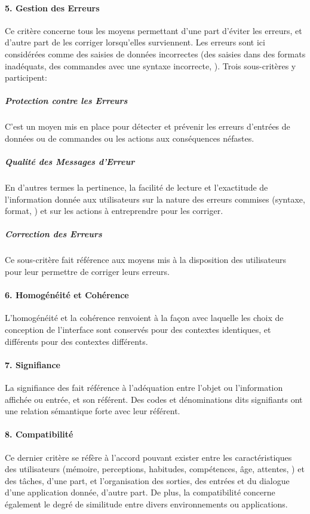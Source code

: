         \paragraph{5. Gestion des Erreurs}
            Ce critère concerne tous les moyens permettant d’une part d’éviter  les erreurs, et d’autre part de les corriger lorsqu’elles surviennent. Les erreurs sont ici considérées comme des saisies de données incorrectes (\eg des saisies dans des formats inadéquats, des commandes avec une syntaxe incorrecte, \etc). Trois sous-critères y participent:
            \subparagraph{Protection contre les Erreurs}
                C'est un moyen mis en place pour détecter et prévenir les erreurs d’entrées de données ou de commandes ou les actions aux conséquences néfastes.
            \subparagraph{Qualité des Messages d’Erreur}
                En d'autres termes la pertinence, la facilité de lecture et l’exactitude de l’information donnée aux utilisateurs sur la nature des erreurs commises (syntaxe, format, \etc) et sur les actions à entreprendre pour les corriger.
            \subparagraph{Correction des Erreurs}
                Ce sous-critère fait référence aux moyens mis à la disposition des utilisateurs pour leur permettre de corriger leurs erreurs.
        \paragraph{6. Homogénéité et Cohérence}
            L'homogénéité et la cohérence renvoient à la façon avec laquelle les choix de conception de l’interface sont conservés pour des contextes identiques, et différents pour des contextes différents.
        \paragraph{7. Signifiance}
            La signifiance des  fait référence à l’adéquation entre l’objet ou l’information affichée ou entrée, et son référent. Des codes et dénominations dits signifiants ont une relation sémantique forte avec leur référent.
        \paragraph{8. Compatibilité}
            Ce dernier critère se réfère à l’accord pouvant exister entre les caractéristiques des utilisateurs (mémoire, perceptions, habitudes, compétences, âge, attentes, \etc) et des tâches, d’une part, et l’organisation des sorties, des entrées et du dialogue d’une application donnée, d’autre part. De plus, la compatibilité concerne également le degré de similitude entre divers environnements ou applications. 
